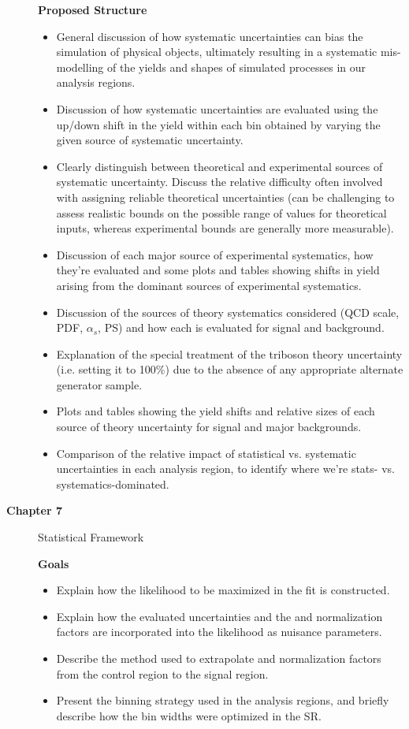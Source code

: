 \begin{description}
\textbf{Proposed Structure}
\begin{itemize}
\item General discussion of how systematic uncertainties can bias the simulation of physical objects, ultimately resulting in a systematic mis-modelling of the yields and shapes of simulated processes in our analysis regions.
\item Discussion of how systematic uncertainties are evaluated using the up/down shift in the yield within each bin obtained by varying the given source of systematic uncertainty.  
\item Clearly distinguish between theoretical and experimental sources of systematic uncertainty. Discuss the relative difficulty often involved with assigning reliable theoretical uncertainties (can be challenging to assess realistic bounds on the possible range of values for theoretical inputs, whereas experimental bounds are generally more measurable). 
\item Discussion of each major source of experimental systematics, how they're evaluated and some plots and tables showing shifts in yield arising from the dominant sources of experimental systematics.
\item Discussion of the sources of theory systematics considered (QCD scale, PDF, $\alpha_s$, PS) and how each is evaluated for signal and background.
\item Explanation of the special treatment of the triboson theory uncertainty (i.e. setting it to 100\%) due to the absence of any appropriate alternate generator sample.
\item Plots and tables showing the yield shifts and relative sizes of each source of theory uncertainty for signal and major backgrounds.
\item Comparison of the relative impact of statistical vs. systematic uncertainties in each analysis region, to identify where we're stats- vs. systematics-dominated.
\end{itemize}

\item[\textbf{Chapter 7}] Statistical Framework

\textbf{Goals}
\begin{itemize}
\item Explain how the likelihood to be maximized in the fit is constructed.
\item Explain how the evaluated uncertainties and the \wjets and \ttbar normalization factors are incorporated into the likelihood as nuisance parameters.
\item Describe the method used to extrapolate \wjets and \ttbar normalization factors from the control region to the signal region.
\item Present the binning strategy used in the analysis regions, and briefly describe how the bin widths were optimized in the \merged SR.
\end{itemize}


\end{description}
